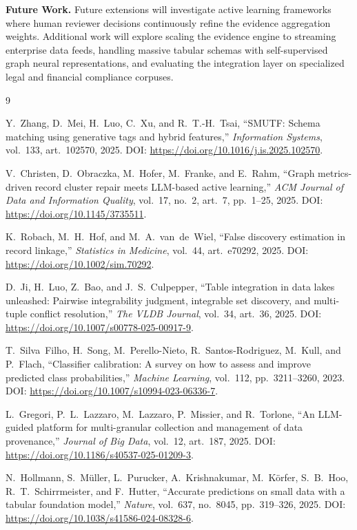 \documentclass[12pt,a4paper]{article}
\begin{document}
\textbf{Future Work.} Future extensions will investigate active learning frameworks where human reviewer decisions continuously refine the evidence aggregation weights. Additional work will explore scaling the evidence engine to streaming enterprise data feeds, handling massive tabular schemas with self-supervised graph neural representations, and evaluating the integration layer on specialized legal and financial compliance corpuses.

\newpage

\begin{thebibliography}{9}
\small

Y.~Zhang, D.~Mei, H.~Luo, C.~Xu, and R.~T.-H.~Tsai, ``SMUTF: Schema matching using generative tags and hybrid features,'' \textit{Information Systems}, vol.~133, art.~102570, 2025. DOI: \url{https://doi.org/10.1016/j.is.2025.102570}.

V.~Christen, D.~Obraczka, M.~Hofer, M.~Franke, and E.~Rahm, ``Graph metrics-driven record cluster repair meets LLM-based active learning,'' \textit{ACM Journal of Data and Information Quality}, vol.~17, no.~2, art.~7, pp.~1--25, 2025. DOI: \url{https://doi.org/10.1145/3735511}.

K.~Robach, M.~H.~Hof, and M.~A.~van~de~Wiel, ``False discovery estimation in record linkage,'' \textit{Statistics in Medicine}, vol.~44, art.~e70292, 2025. DOI: \url{https://doi.org/10.1002/sim.70292}.

D.~Ji, H.~Luo, Z.~Bao, and J.~S.~Culpepper, ``Table integration in data lakes unleashed: Pairwise integrability judgment, integrable set discovery, and multi-tuple conflict resolution,'' \textit{The VLDB Journal}, vol.~34, art.~36, 2025. DOI: \url{https://doi.org/10.1007/s00778-025-00917-9}.

T.~Silva~Filho, H.~Song, M.~Perello-Nieto, R.~Santos-Rodriguez, M.~Kull, and P.~Flach, ``Classifier calibration: A survey on how to assess and improve predicted class probabilities,'' \textit{Machine Learning}, vol.~112, pp.~3211--3260, 2023. DOI: \url{https://doi.org/10.1007/s10994-023-06336-7}.

L.~Gregori, P.~L.~Lazzaro, M.~Lazzaro, P.~Missier, and R.~Torlone, ``An LLM-guided platform for multi-granular collection and management of data provenance,'' \textit{Journal of Big Data}, vol.~12, art.~187, 2025. DOI: \url{https://doi.org/10.1186/s40537-025-01209-3}.

N.~Hollmann, S.~M\"uller, L.~Purucker, A.~Krishnakumar, M.~K\"orfer, S.~B.~Hoo, R.~T.~Schirrmeister, and F.~Hutter, ``Accurate predictions on small data with a tabular foundation model,'' \textit{Nature}, vol.~637, no.~8045, pp.~319--326, 2025. DOI: \url{https://doi.org/10.1038/s41586-024-08328-6}.

\end{thebibliography}
\end{document}
